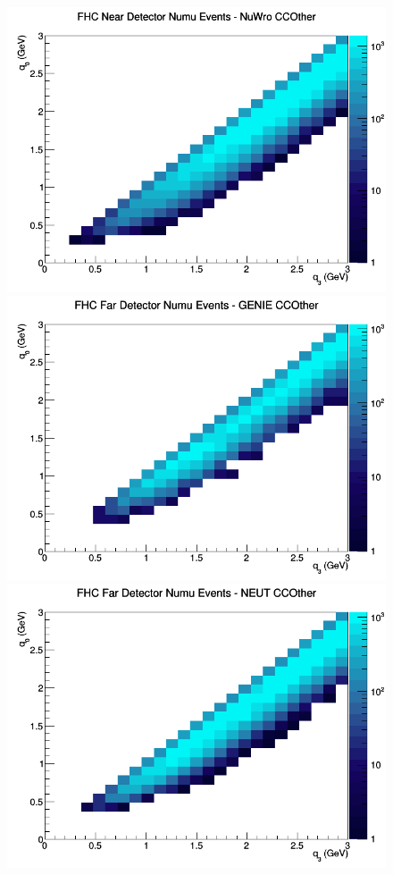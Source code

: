 \documentclass[12pt]{article}
\begin{document}
\begin{figure}[h]
\includegraphics[width=\linewidth]{q0_q3/nominal/CCOther_FHC_ND_numu_q3_q0_NuWro.png}
\endminipage
\newline
{}
\includegraphics[width=\linewidth]{q0_q3/nominal/CCOther_FHC_FD_numu_q3_q0_GENIE.png}
\endminipage
{}
\includegraphics[width=\linewidth]{q0_q3/nominal/CCOther_FHC_FD_numu_q3_q0_NEUT.png}

\end{figure}
\end{document}
